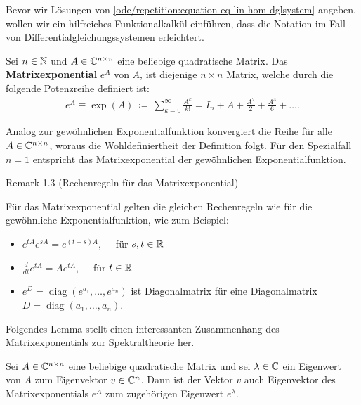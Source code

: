 \par
Bevor wir Lösungen von \cref{ode/repetition:equation-eq-lin-hom-dglsystem} angeben, wollen wir ein hilfreiches Funktionalkalkül einführen, dass die Notation im Fall von Differentialgleichungssystemen erleichtert.
\label{ode/repetition:definition-12}
\begin{definition}{}{}



\par
Sei \(n \in \mathbb{N}\) und \(A \in \mathbb{C}^{n \times n}\) eine beliebige quadratische Matrix.
Das \textbf{Matrixexponential} \(e^A\) von \(A\), ist diejenige \(n\times n\) Matrix, welche durch die folgende Potenzreihe definiert ist:
\begin{align*}
e^A \equiv \exp(A) \ \coloneqq \ \sum_{k=0}^\infty \frac{A^k}{k!} = I_n + A + \frac{A^2}{2} + \frac{A^3}{6} + \ldots.
\end{align*}
\par
Analog zur gewöhnlichen Exponentialfunktion konvergiert die Reihe für alle \(A \in \mathbb{C}^{n \times n}\), woraus die Wohldefiniertheit der Definition folgt.
Für den Spezialfall \(n=1\) entspricht das Matrixexponential der gewöhnlichen Exponentialfunktion.
\end{definition}
\label{ode/repetition:rem:matrixexponential_regeln}
\begin{emphBox}{}{}{Remark 1.3 (Rechenregeln für das Matrixexponential)}



\par
Für das Matrixexponential gelten die gleichen Rechenregeln wie für die gewöhnliche Exponentialfunktion, wie zum Beispiel:
\begin{itemize}
\item {} 
\par
\(e^{tA}e^{sA} = e^{(t+s)A}, \quad\) für \(s,t \in \mathbb{R}\)

\item {} 
\par
\(\frac{d}{dt} e^{tA} = Ae^{tA}, \quad\) für \(t \in \mathbb{R}\)

\item {} 
\par
\( e^{D} = \operatorname{diag}(e^{a_1}, \ldots, e^{a_n})\) ist Diagonalmatrix für eine Diagonalmatrix \(D = \operatorname{diag}(a_1, \ldots, a_n)\).

\end{itemize}
\end{emphBox}

\par
Folgendes Lemma stellt einen interessanten Zusammenhang des Matrixexponentials zur Spektraltheorie her.
\label{ode/repetition:lem:mpotew}
\begin{lemma}{}{}



\par
Sei \(A \in \mathbb{C}^{n\times n}\) eine beliebige quadratische Matrix und sei \(\lambda \in \mathbb{C}\) ein Eigenwert von \(A\) zum
Eigenvektor \(v \in \mathbb{C}^n\).
Dann ist der Vektor \(v\) auch Eigenvektor des Matrixexponentials \(e^A\) zum zugehörigen Eigenwert \(e^\lambda\).
\end{lemma}

